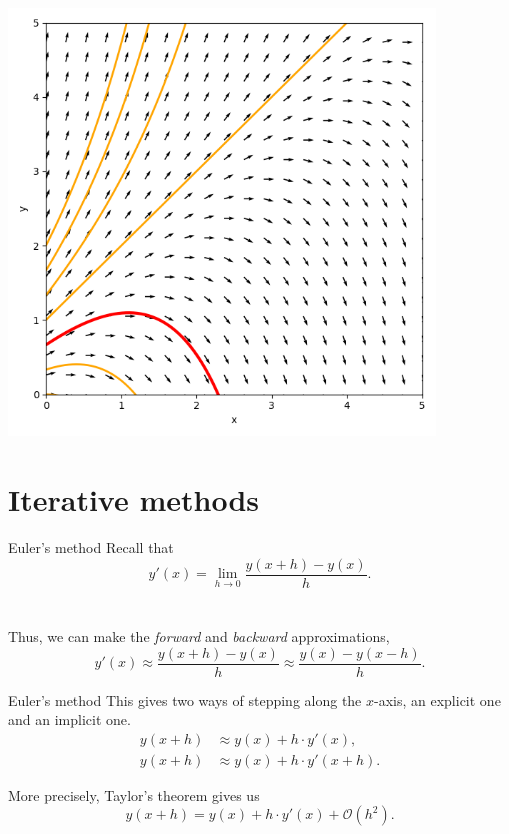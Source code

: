 \documentclass{beamer}
\begin{document}
    \begin{frame}[plain]
        \begin{center}
            \includegraphics[width=0.85\textwidth]{./img/directionfield_curves.png}
        \end{center}
    \end{frame}
    

    \section{Iterative methods}

    \begin{frame}{Euler's method}
        Recall that \[
            y'(x) = \lim_{h \to 0} \frac{y(x + h) - y(x)}{h}.
        \] \\~\\

        Thus, we can make the \emph{forward} and \emph{backward} approximations,
        \[
            y'(x) \approx \frac{y(x + h) - y(x)}{h} \approx \frac{y(x) - y(x -
            h)}{h}.
        \] 
    \end{frame}

    \begin{frame}{Euler's method}
        This gives two ways of stepping along the $x$-axis, an explicit one and an
        implicit one. \begin{align*}
            y(x + h) &\approx y(x) + h\cdot y'(x), \\
            y(x + h) &\approx y(x) + h\cdot y'(x + h).
        \end{align*}

        More precisely, Taylor's theorem gives us \[
            y(x + h) = y(x) + h\cdot y'(x) + \mathcal{O}(h^2).
        \] 
    \end{frame}
\end{document}
